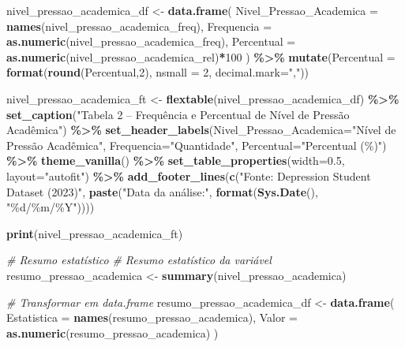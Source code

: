 \documentclass[
]{article}
\newenvironment{Shaded}{\begin{snugshade}}{\end{snugshade}}
\newcommand{\AttributeTok}[1]{\textcolor[rgb]{0.13,0.29,0.53}{#1}}
\newcommand{\CommentTok}[1]{\textcolor[rgb]{0.56,0.35,0.01}{\textit{#1}}}
\newcommand{\DecValTok}[1]{\textcolor[rgb]{0.00,0.00,0.81}{#1}}
\newcommand{\FloatTok}[1]{\textcolor[rgb]{0.00,0.00,0.81}{#1}}
\newcommand{\FunctionTok}[1]{\textcolor[rgb]{0.13,0.29,0.53}{\textbf{#1}}}
\newcommand{\NormalTok}[1]{#1}
\newcommand{\OtherTok}[1]{\textcolor[rgb]{0.56,0.35,0.01}{#1}}
\newcommand{\SpecialCharTok}[1]{\textcolor[rgb]{0.81,0.36,0.00}{\textbf{#1}}}
\newcommand{\StringTok}[1]{\textcolor[rgb]{0.31,0.60,0.02}{#1}}
\begin{document}
\begin{Shaded}
\begin{Highlighting}[]
\NormalTok{nivel\_pressao\_academica\_df }\OtherTok{\textless{}{-}} \FunctionTok{data.frame}\NormalTok{(}
  \AttributeTok{Nivel\_Pressao\_Academica =} \FunctionTok{names}\NormalTok{(nivel\_pressao\_academica\_freq),}
  \AttributeTok{Frequencia =} \FunctionTok{as.numeric}\NormalTok{(nivel\_pressao\_academica\_freq),}
  \AttributeTok{Percentual =} \FunctionTok{as.numeric}\NormalTok{(nivel\_pressao\_academica\_rel)}\SpecialCharTok{*}\DecValTok{100}
\NormalTok{) }\SpecialCharTok{\%\textgreater{}\%}
  \FunctionTok{mutate}\NormalTok{(}\AttributeTok{Percentual =} \FunctionTok{format}\NormalTok{(}\FunctionTok{round}\NormalTok{(Percentual,}\DecValTok{2}\NormalTok{), }\AttributeTok{nsmall =} \DecValTok{2}\NormalTok{, }\AttributeTok{decimal.mark=}\StringTok{","}\NormalTok{))}

\NormalTok{nivel\_pressao\_academica\_ft }\OtherTok{\textless{}{-}} \FunctionTok{flextable}\NormalTok{(nivel\_pressao\_academica\_df) }\SpecialCharTok{\%\textgreater{}\%}
  \FunctionTok{set\_caption}\NormalTok{(}\StringTok{"Tabela 2 – Frequência e Percentual de Nível de Pressão Acadêmica"}\NormalTok{) }\SpecialCharTok{\%\textgreater{}\%}
  \FunctionTok{set\_header\_labels}\NormalTok{(}\AttributeTok{Nivel\_Pressao\_Academica=}\StringTok{"Nível de Pressão Acadêmica"}\NormalTok{, }\AttributeTok{Frequencia=}\StringTok{"Quantidade"}\NormalTok{, }\AttributeTok{Percentual=}\StringTok{"Percentual (\%)"}\NormalTok{) }\SpecialCharTok{\%\textgreater{}\%}
  \FunctionTok{theme\_vanilla}\NormalTok{() }\SpecialCharTok{\%\textgreater{}\%}
  \FunctionTok{set\_table\_properties}\NormalTok{(}\AttributeTok{width=}\FloatTok{0.5}\NormalTok{, }\AttributeTok{layout=}\StringTok{"autofit"}\NormalTok{) }\SpecialCharTok{\%\textgreater{}\%}
  \FunctionTok{add\_footer\_lines}\NormalTok{(}\FunctionTok{c}\NormalTok{(}\StringTok{"Fonte: Depression Student Dataset (2023)"}\NormalTok{, }\FunctionTok{paste}\NormalTok{(}\StringTok{"Data da análise:"}\NormalTok{, }\FunctionTok{format}\NormalTok{(}\FunctionTok{Sys.Date}\NormalTok{(), }\StringTok{"\%d/\%m/\%Y"}\NormalTok{))))}

\FunctionTok{print}\NormalTok{(nivel\_pressao\_academica\_ft)}

\CommentTok{\# Resumo estatístico}
\CommentTok{\# Resumo estatístico da variável}
\NormalTok{resumo\_pressao\_academica }\OtherTok{\textless{}{-}} \FunctionTok{summary}\NormalTok{(nivel\_pressao\_academica)}

\CommentTok{\# Transformar em data.frame}
\NormalTok{resumo\_pressao\_academica\_df }\OtherTok{\textless{}{-}} \FunctionTok{data.frame}\NormalTok{(}
  \AttributeTok{Estatistica =} \FunctionTok{names}\NormalTok{(resumo\_pressao\_academica),}
  \AttributeTok{Valor =} \FunctionTok{as.numeric}\NormalTok{(resumo\_pressao\_academica)}
\NormalTok{)}


\end{Highlighting}
\end{Shaded}
\end{document}
